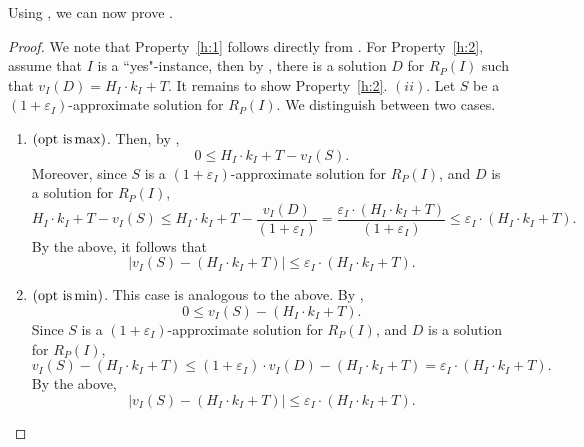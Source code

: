 \documentclass[11pt,letter]{article}
\newcommand{\opt}{\textnormal{opt}}
\newcommand{\eps}{{\varepsilon}}
\begin{document}
Using , we can now prove . 
\thmH*
\begin{proof}
We note that Property~\ref{h:1} follows directly from . For Property~\ref{h:2}, assume that $I$ is a ``yes"-instance, then by , there is a solution $D$ for $R_P(I)$ such that $v_I(D) = H_I \cdot k_I+T$. It remains to show Property~\ref{h:2}. $(ii)$.
Let $S$ be a $(1+\eps_I)$-approximate solution for $R_P(I)$. We distinguish between two cases. 
	
		\begin{enumerate}
		\item $(\opt \textnormal{ is}   \max)$. Then, by ,
		\begin{equation*}
			\label{eq:Max1}
			0 \leq H_I \cdot k_I+T-v_I(S).
		\end{equation*} Moreover, since $S$ is a $(1+\eps_I)$-approximate solution for $R_P(I)$, and $D$ is a solution for $R_P(I)$,
		\begin{equation*}
			\label{eq:MaxApprox}
	H_I \cdot k_I+T-v_I(S) \leq H_I \cdot k_I+T - \frac{v_I(D)}{(1+\eps_I)} =  \frac{\eps_I \cdot \left(H_I \cdot k_I+T \right) }{(1+\eps_I)} \leq \eps_I \cdot \left(H_I \cdot k_I+T \right). 
		\end{equation*} %
	By the above, it follows that%
	\begin{equation*}
			  \left|	v_I(S)-\left(H_I \cdot k_I+T\right) \right|	\leq 	\eps_I \cdot \left(H_I \cdot k_I+T\right). 
	\end{equation*}
		\item  $(\opt \textnormal{ is}   \min)$. This case is analogous to the above.  By , 
		\begin{equation*}
			\label{eq:Min1}
	0 \leq v_I(S) - \left(H_I \cdot k_I+T\right). 
		\end{equation*} Since $S$ is a $(1+\eps_I)$-approximate solution for $R_P(I)$, and $D$ is a solution for $R_P(I)$,
		\begin{equation*}
			\label{eq:MinApprox}
		v_I(S) - \left(H_I \cdot k_I+T\right) \leq (1+\eps_I) \cdot v_I(D) - \left(H_I \cdot k_I+T\right) =   \eps_I \cdot \left(H_I \cdot k_I+T \right). 
		\end{equation*} 
		By the above, 
		\begin{equation*}
			\left|	v_I(S)-\left(H_I \cdot k_I+T\right) \right|	\leq 	\eps_I \cdot \left(H_I \cdot k_I+T\right). 
		\end{equation*}


\end{enumerate}
\end{proof}
\end{document}

